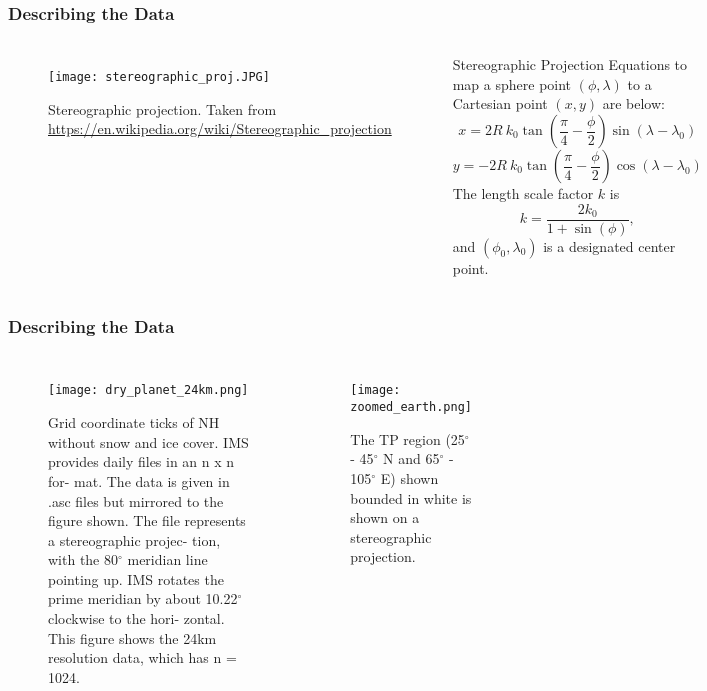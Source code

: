 \begin{frame}
\frametitle{Describing the Data}
\begin{columns}
\begin{figure}
\vspace*{-.6cm}
\begin{minipage}{1\columnwidth}
\centering
\texttt{[image: stereographic\_proj.JPG]}
\caption{\tiny{Stereographic projection. Taken from \url{https://en.wikipedia.org/wiki/Stereographic_projection}}}
\end{minipage}
\end{figure}
\begin{block}{Stereographic Projection}
Equations to map a sphere point $(\phi, \lambda)$ to a Cartesian point $(x,y)$  are below:
\begin{equation*}
x = 2R \ k_0 \tan (\frac{\pi}{4} - \frac{\phi}{2}) \sin (\lambda - \lambda_{0} )
\end{equation*}
\begin{equation*}
y = -2R \ k_0 \tan (\frac{\pi}{4} - \frac{\phi}{2})\cos(\lambda - \lambda_{0})
\end{equation*}
The length scale factor $k$ is
\begin{equation*}
k = \frac{2k_{0}}{1+\sin(\phi)},
\end{equation*}
and $(\phi_0,\lambda_0)$ is a designated center point.
\end{block}
\end{columns}
\end{frame}

\begin{frame}
\frametitle{Describing the Data}
\begin{columns}
\begin{figure}
\vspace*{-.6cm}
\begin{minipage}{1\linewidth}
\texttt{[image: dry\_planet\_24km.png]}
\caption{\tiny{Grid coordinate ticks of NH without snow
and ice cover. IMS provides daily files in an n x n for-
mat. The data is given in .asc files but mirrored to the
figure shown. The file represents a stereographic projec-
tion, with the 80$^\circ$ meridian line pointing up. IMS rotates
the prime meridian by about 10.22$^\circ$ clockwise to the hori-
zontal. This figure shows the 24km resolution data, which
has n = 1024.}}
\end{minipage}
\end{figure}
\begin{figure}
\begin{minipage}{1\linewidth}
\texttt{[image: zoomed\_earth.png]}
\caption{\tiny{The TP region (25$^\circ$ - 45$^\circ$ N and 65$^\circ$ - 105$^\circ$ E) shown
bounded in white is shown on a stereographic projection.}}
\end{minipage}
\end{figure}
\end{columns}
\end{frame}


